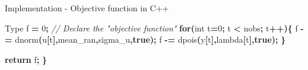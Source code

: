 \documentclass[aspectratio=169]{beamer}
\newenvironment{Shaded}{\begin{snugshade}}{\end{snugshade}}
\newcommand{\CommentTok}[1]{\textcolor[rgb]{0.56,0.35,0.01}{\textit{#1}}}
\newcommand{\ControlFlowTok}[1]{\textcolor[rgb]{0.13,0.29,0.53}{\textbf{#1}}}
\newcommand{\DataTypeTok}[1]{\textcolor[rgb]{0.13,0.29,0.53}{#1}}
\newcommand{\DecValTok}[1]{\textcolor[rgb]{0.00,0.00,0.81}{#1}}
\newcommand{\KeywordTok}[1]{\textcolor[rgb]{0.13,0.29,0.53}{\textbf{#1}}}
\newcommand{\NormalTok}[1]{#1}
\newcommand{\OperatorTok}[1]{\textcolor[rgb]{0.81,0.36,0.00}{\textbf{#1}}}
\begin{document}
\begin{frame}[fragile]{Implementation - Objective function in C++}
\begin{Shaded}
\begin{Highlighting}[]
\NormalTok{  Type f }\OperatorTok{=} \DecValTok{0}\OperatorTok{;}                           \CommentTok{// Declare the "objective function"}
  \ControlFlowTok{for}\OperatorTok{(}\DataTypeTok{int}\NormalTok{ t}\OperatorTok{=}\DecValTok{0}\OperatorTok{;}\NormalTok{ t }\OperatorTok{\textless{}}\NormalTok{ nobs}\OperatorTok{;}\NormalTok{ t}\OperatorTok{++)\{}
\NormalTok{    f }\OperatorTok{{-}=}\NormalTok{ dnorm}\OperatorTok{(}\NormalTok{u}\OperatorTok{[}\NormalTok{t}\OperatorTok{],}\NormalTok{mean\_ran}\OperatorTok{,}\NormalTok{sigma\_u}\OperatorTok{,}\KeywordTok{true}\OperatorTok{);}
\NormalTok{    f }\OperatorTok{{-}=}\NormalTok{ dpois}\OperatorTok{(}\NormalTok{y}\OperatorTok{[}\NormalTok{t}\OperatorTok{],}\NormalTok{lambda}\OperatorTok{[}\NormalTok{t}\OperatorTok{],}\KeywordTok{true}\OperatorTok{);}
  \OperatorTok{\}}
  
  \ControlFlowTok{return}\NormalTok{ f}\OperatorTok{;}
\OperatorTok{\}}
\end{Highlighting}
\end{Shaded}

\normalsize
\end{frame}
\end{document}
